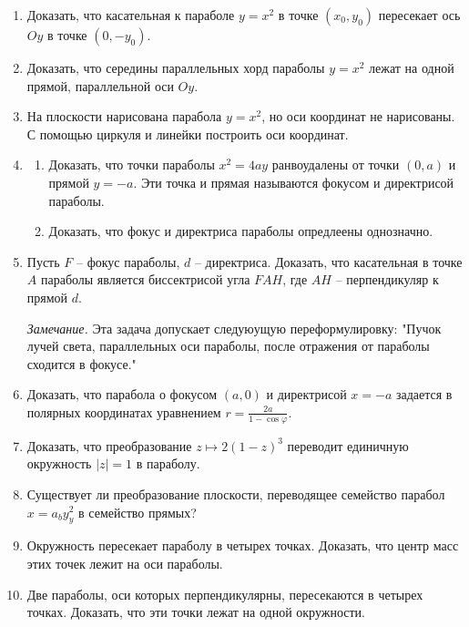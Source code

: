 \begin{enumerate}

	\item Доказать, что касательная к параболе $y = x^2$ в точке $(x_0, y_0)$ пересекает ось $Oy$ в точке $(0, -y_0)$.

	\item Доказать, что середины параллельных хорд параболы $y = x^2$ лежат на одной прямой, параллельной оси $Oy$.

	\item На плоскости нарисована парабола $y = x^2$, но оси координат не нарисованы. С помощью циркуля и линейки построить оси координат.

	\item
	\begin{enumerate}
		\item Доказать, что точки параболы $x^2 = 4ay$ ранвоудалены от точки $(0, a)$ и прямой $y = -a$. Эти точка и прямая называются фокусом и директрисой параболы.
		\item Доказать, что фокус и директриса параболы опредлеены однозначно.
	\end{enumerate}

	\item Пусть $F$ -- фокус параболы, $d$ -- директриса. Доказать, что касательная в точке $A$ параболы является биссектрисой угла $FAH$, где $AH$ -- перпендикуляр к прямой $d$.

	\textit{Замечание.} Эта задача допускает следуюущую переформулировку: "Пучок лучей света, параллельных оси параболы, после отражения от параболы сходится в фокусе."

	\item Доказать, что парабола о фокусом $(a, 0)$ и директрисой $x = -a$ задается в полярных координатах уравнением $r = \frac{2a}{1 - \cos\varphi}.$

	\item Доказать, что преобразование $z \mapsto 2(1-z)^3$ переводит единичную окружность $|z| = 1$ в параболу.
	
	\item Существует ли преобразование плоскости, переводящее семейство парабол $x = a _ by _ y^2$ в семейство прямых?

	\item Окружность пересекает параболу в четырех точках. Доказать, что центр масс этих точек лежит на оси параболы.

	\item Две параболы, оси которых перпендикулярны, пересекаются в четырех точках. Доказать, что эти точки лежат на одной окружности.


\end{enumerate}
